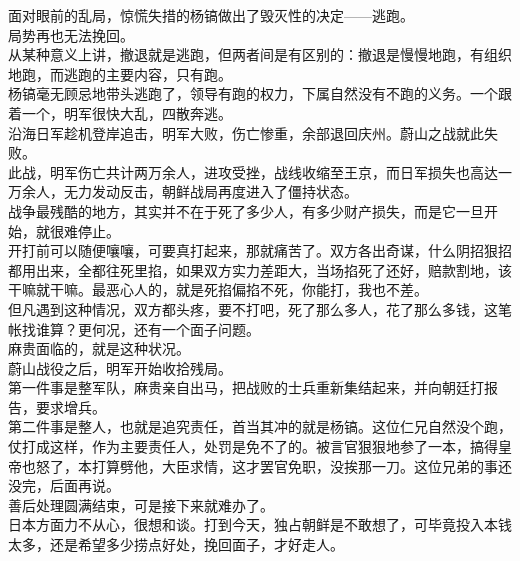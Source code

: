\begin{multicols}{\theparacolNo}
面对眼前的乱局，惊慌失措的杨镐做出了毁灭性的决定——逃跑。\\

局势再也无法挽回。\\

从某种意义上讲，撤退就是逃跑，但两者间是有区别的：撤退是慢慢地跑，有组织地跑，而逃跑的主要内容，只有跑。\\

杨镐毫无顾忌地带头逃跑了，领导有跑的权力，下属自然没有不跑的义务。一个跟着一个，明军很快大乱，四散奔逃。\\

沿海日军趁机登岸追击，明军大败，伤亡惨重，余部退回庆州。蔚山之战就此失败。\\

此战，明军伤亡共计两万余人，进攻受挫，战线收缩至王京，而日军损失也高达一万余人，无力发动反击，朝鲜战局再度进入了僵持状态。\\

战争最残酷的地方，其实并不在于死了多少人，有多少财产损失，而是它一旦开始，就很难停止。\\

开打前可以随便嚷嚷，可要真打起来，那就痛苦了。双方各出奇谋，什么阴招狠招都用出来，全都往死里掐，如果双方实力差距大，当场掐死了还好，赔款割地，该干嘛就干嘛。最恶心人的，就是死掐偏掐不死，你能打，我也不差。\\

但凡遇到这种情况，双方都头疼，要不打吧，死了那么多人，花了那么多钱，这笔帐找谁算？更何况，还有一个面子问题。\\

麻贵面临的，就是这种状况。\\

蔚山战役之后，明军开始收拾残局。\\

第一件事是整军队，麻贵亲自出马，把战败的士兵重新集结起来，并向朝廷打报告，要求增兵。\\

第二件事是整人，也就是追究责任，首当其冲的就是杨镐。这位仁兄自然没个跑，仗打成这样，作为主要责任人，处罚是免不了的。被言官狠狠地参了一本，搞得皇帝也怒了，本打算劈他，大臣求情，这才罢官免职，没挨那一刀。这位兄弟的事还没完，后面再说。\\

善后处理圆满结束，可是接下来就难办了。\\

日本方面力不从心，很想和谈。打到今天，独占朝鲜是不敢想了，可毕竟投入本钱太多，还是希望多少捞点好处，挽回面子，才好走人。\\


\end{multicols}
